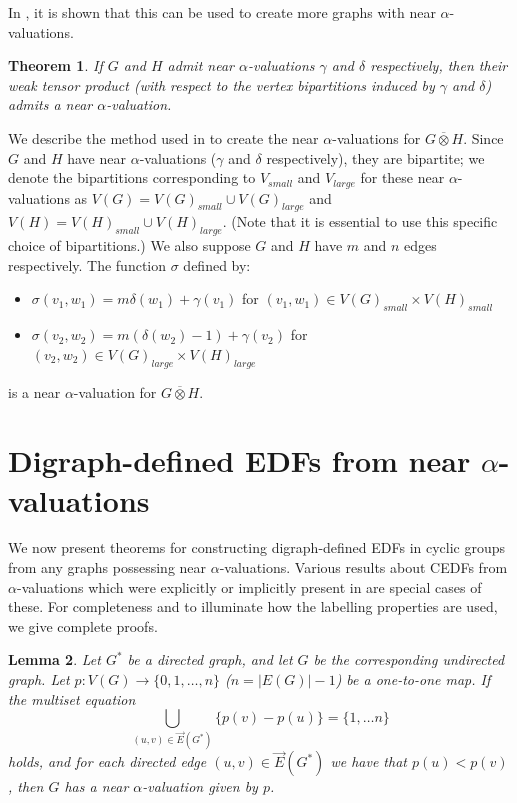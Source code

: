 \documentclass[12pt, a4paper]{article}
\newtheorem{theorem}{Theorem}[section]
\newtheorem{lemma}[theorem]{Lemma}
\theoremstyle{definition}
\begin{document}
In \cite{El-Zanati}, it is shown that this can be used to create more graphs with near $\alpha$-valuations.

\begin{theorem}\label{nearalphaprod}
If $G$ and $H$ admit near $\alpha$-valuations $\gamma$ and $\delta$ respectively, then their weak tensor product (with respect to the vertex bipartitions induced by $\gamma$  and $\delta$) admits a near $\alpha$-valuation.
\end{theorem}

We describe the method used in \cite{El-Zanati} to create the near $\alpha$-valuations for $G \overline{\otimes} H$. Since $G$ and $H$ have near $\alpha$-valuations ($\gamma$ and $\delta$ respectively), they are bipartite; we denote the bipartitions corresponding to $V_{small}$ and $V_{large}$ for these near $\alpha$-valuations as $V(G)=V(G)_{small} \cup V(G)_{large} $ and $V(H)=V(H)_{small} \cup V(H)_{large}$. (Note that it is essential to use this specific choice of bipartitions.)  We also suppose $G$ and $H$ have $m$ and $n$ edges respectively. The function $\sigma$ defined by:
\begin{itemize}
\item $\sigma(v_1,w_1) = m\delta(w_1)+\gamma(v_1)$ for $(v_1,w_1) \in V(G)_{small} \times V(H)_{small}$
\item $\sigma(v_2,w_2) = m(\delta(w_2)-1)+\gamma(v_2)$ for $(v_2,w_2) \in V(G)_{large} \times V(H)_{large}$
\end{itemize}
is a near $\alpha$-valuation for $G \overline{\otimes} H$.



\section{Digraph-defined EDFs from near $\alpha$-valuations}

We now present theorems for constructing digraph-defined EDFs in cyclic groups from any graphs possessing near $\alpha$-valuations.  Various results about CEDFs from $\alpha$-valuations which were explicitly or implicitly present in \cite{PatStiCEDF} are special cases of these. For completeness and to illuminate how the labelling properties are used, we give complete proofs.


\begin{lemma}\label{directtopm}
Let $G^*$ be a directed graph, and let $G$ be the corresponding undirected graph.  Let $p:V(G) \rightarrow \{0,1,\ldots,n\}$ ($n=|E(G)|-1$) be a one-to-one map. 
If the multiset equation 
    $$\bigcup_{(u,v)\in \overrightarrow{E}(G^*)} \{ p(v)-p(u) \} =\{1, \ldots n\}$$ 
    holds, and for each directed edge $(u,v)\in \overrightarrow{E}(G^*)$ we have that $p(u) < p(v)$, 
    then $G$ has a near $\alpha$-valuation given by $p$.
\end{lemma}
\end{document}
